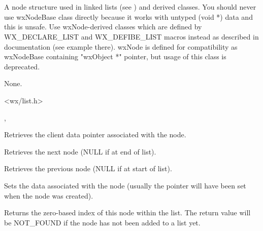 \section{}\label{wxnode}

A node structure used in linked lists (see ) and
derived classes. You should never use wxNodeBase class directly because it
works with untyped (void *) data and this is unsafe. Use wxNode-derived classes
which are defined by WX\_DECLARE\_LIST and WX\_DEFIBE\_LIST macros instead as
described in  documentation (see example there). wxNode
is defined for compatibility as wxNodeBase containing "wxObject *" pointer, but
usage of this class is deprecated.


None.


<wx/list.h>


, 




Retrieves the client data pointer associated with the node.



Retrieves the next node (NULL if at end of list).



Retrieves the previous node (NULL if at start of list).



Sets the data associated with the node (usually the pointer will have been
set when the node was created).



Returns the zero-based index of this node within the list. The return value
will be NOT\_FOUND if the node has not been added to a list yet.

